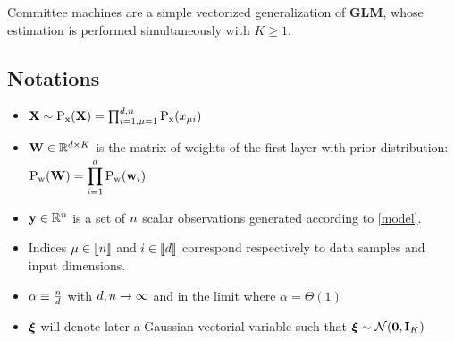 \begin{remark}
	Committee machines are a simple vectorized generalization of \textbf{GLM}, whose estimation is performed simultaneously with $K \geq 1$.
\end{remark}


\subsection{Notations}
\begin{itemize}
	\item ${\mathbf{X}} \sim {\mathrm{P}}_{\text{x}}({\mathbf{X}}) = \prod_{i=1, \mu=1}^{d, n} {\mathrm{P}}_{\text{x}}(x_{\mu i})$
	\item ${\mathbf{W}} \in \mathbb{R}^{d \times K}$ is the matrix of weights of the first layer with prior distribution: ${\mathrm{P}}_{\mathrm{w}}({\mathbf{W}}) = \displaystyle \prod_{i=1}^d {\mathrm{P}}_{\mathrm{w}}({\mathbf{w}}_i)$
	\item ${\mathbf{y}} \in \mathbb{R}^{n}$ is a set of $n$ scalar observations generated according to \eqref{model}.
	\item Indices $\mu \in  \llbracket n \rrbracket $ and $i \in \llbracket d \rrbracket$ correspond respectively to data samples and input dimensions.
	\item $\alpha \equiv \frac{n}{d}$ with $d, n \to \infty$ and in the limit where $\alpha= \Theta(1)$
	\item ${\boldsymbol{\xi}}$ will denote later a Gaussian vectorial variable such that ${\boldsymbol{\xi}} \sim \mathcal{N}({\mathbf{0}},{\mathbf{I}}_K)$
\end{itemize}

